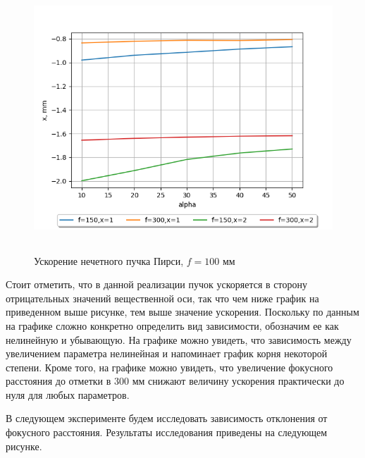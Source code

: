 {    \begin{figure}[H]
        \centering
        \includegraphics[height = 10cm]{plots/!graphics_acc_param.png}
        \caption{Ускорение нечетного пучка Пирси, $f = 100$ мм}
        \label{acc_param}
    \end{figure}
    \vspace{0.5cm}
    Стоит отметить, что в данной реализации пучок ускоряется в сторону отрицательных значений вещественной оси, так что чем ниже график на
    приведенном выше рисунке, тем выше значение ускорения.
    Поскольку по данным на графике сложно конкретно определить вид зависимости, обозначим ее как нелинейную и убывающую.
    На графике можно увидеть, что зависимость между увеличением параметра нелинейная и напоминает график корня некоторой степени.
    Кроме того, на графике можно увидеть, что увеличение фокусного расстояния до отметки в 300 мм снижают величину ускорения практически до нуля для любых параметров.

    В следующем эксперименте будем исследовать зависимость отклонения от фокусного расстояния. Результаты исследования приведены на следующем рисунке.

}
